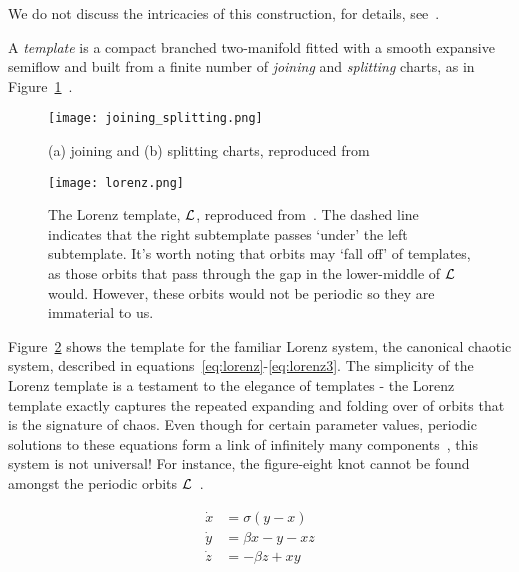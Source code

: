 \documentclass[paper.tex]{subfiles}
\begin{document}
We do not discuss the intricacies of this construction, for details, see~\cite{bw1983b}.


\begin{definition}[Template]
  A \emph{template} is a compact branched two-manifold fitted with a smooth expansive semiflow and built from a finite number of \emph{joining} and \emph{splitting} charts, as in Figure~\ref{fig:joinsplit}~\cite{knottyode}.\label{def:template}
\end{definition}


\begin{figure}[h]
  \centering
  \texttt{[image: joining\_splitting.png]}
  \caption[what goes here]{(a) joining and (b) splitting charts, reproduced from~\cite{knottyode}\protect\footnotemark}\label{fig:joinsplit}
\end{figure}






\begin{figure}[h]
  \centering
  \texttt{[image: lorenz.png]}
  \caption{The Lorenz template, $\mathcal{L}$, reproduced from~\cite{knottyode}. The dashed line indicates that the right subtemplate passes `under' the left subtemplate. It's worth noting that orbits may `fall off' of templates, as those orbits
  that pass through the gap in the lower-middle of $\mathcal{L}$ would. However, these orbits would not be periodic so they are immaterial to us.}\label{fig:lorenz}
\end{figure}

Figure~\ref{fig:lorenz} shows the template for the familiar Lorenz system, the canonical chaotic system, described in equations~\ref{eq:lorenz}-\ref{eq:lorenz3}. The simplicity of the Lorenz template is a testament to the elegance of
templates - the Lorenz template exactly captures the repeated expanding and folding over of orbits that is the signature of chaos. Even though for certain parameter values, periodic solutions to these equations form a link of infinitely
many components~\cite{knottyode}, this system is not universal! For instance, the figure-eight knot cannot be found amongst the periodic orbits $\mathcal{L}$~\cite{knottyode}.


\begin{align}
  \label{eq:lorenz}
  \dot{x} &= \sigma(y - x ) \\
  \label{eq:lorenz2}
  \dot{y} &= \beta x - y - x z \\
  \label{eq:lorenz3}
  \dot{z} &= - \beta z + x y
\end{align}
\end{document}
